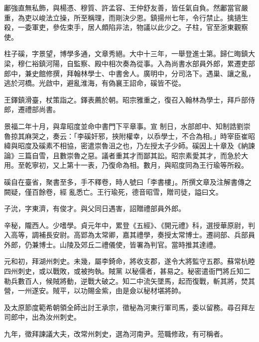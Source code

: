 \begin{pinyinscope}
 鄘強直無私飾，與楊憑、穆質、許孟容、王仲舒友善，皆任氣自負。然鄘當官嚴重，為吏以峻法立操，所至稱理，而剛決少恩。鎮揚州七年，令行禁止。擒擿生殺，一委軍吏，參佐束手，居人頗陷非法，物議以此少之。子柱，官至浙東觀察
 使。



 柱子磎，字景望，博學多通，文章秀絕。大中十三年，一舉登進士第。歸仁晦鎮大梁，穆仁裕鎮河陽，自監察、殿中相次奏為從事。入為尚書水部員外郎，累遷吏部郎中，兼史館修撰，拜翰林學士、中書舍人。廣明中，分司洛下。遇巢、讓之亂，逃於河橋。光啟中，避亂淮海，有偽襄王詔命，磎皆不從。



 王鐸鎮滑臺，杖策詣之。鐸表薦於朝。昭宗雅重之，復召入翰林為學士，拜戶部侍郎，遷禮部尚書。



 景福二年十月，與韋昭度並命中書門下平章事。宣
 制日，水部郎中、知制誥劉崇魯掠其麻哭之，奏云：「李磎奸邪，挾附權幸，以忝學士，不合為相。」時宰臣崔昭緯與昭度及磎素不相協，密遣崇魯沮之也，乃左授太子少師。磎因上十章及《納諫論》三篇自雪，且數崇魯之惡。議者重其才而鄙其訟。昭宗素愛其才，而急於大用。至乾寧初，又上第十一表，乃復命為相。數月，與昭度同為王行瑜等所殺。



 磎自在臺省，聚書至多，手不釋卷，時人號曰「李書樓」。所撰文章及注解書傳之闕疑，僅百餘卷，經
 亂悉亡。王行瑜死，德音昭雪，贈司徒，謚曰文。



 子沇，字東濟，有俊才。與父同日遇害，詔贈禮部員外郎。



 辛秘，隴西人。少嗜學。貞元年中，累登《五經》、《開元禮》科，選授華原尉，判入高等，調補長安尉。高郢為太常卿，嘉其禮學，奏授太常博士。遷祠部、兵部員外郎，仍兼博士。山陵及郊丘二禮儀使，皆署為判官。當時推其達禮。



 元和初，拜湖州刺史。未幾，屬李錡命，將收支郡，遂令大將監守五郡。蘇常杭睦四州刺史，或以戰敗，或被拘執。賊黨
 以秘儒者，甚易之。秘密遣衙門將丘知二勒兵數百人，候賊將動，逆戰大破之。知二中流矢墜馬，起而復戰，斬其將，焚其營，一州遂安。賊平，以功賜金紫，由是僉以秘材堪將帥。



 及太原節度範希朝領全師出討王承宗，徵秘為河東行軍司馬，委以留務。尋召拜左司郎中，出為汝州刺史。



 九年，徵拜諫議大夫，改常州刺史，選為河南尹。蒞職修政，有可稱者。




\end{pinyinscope}
